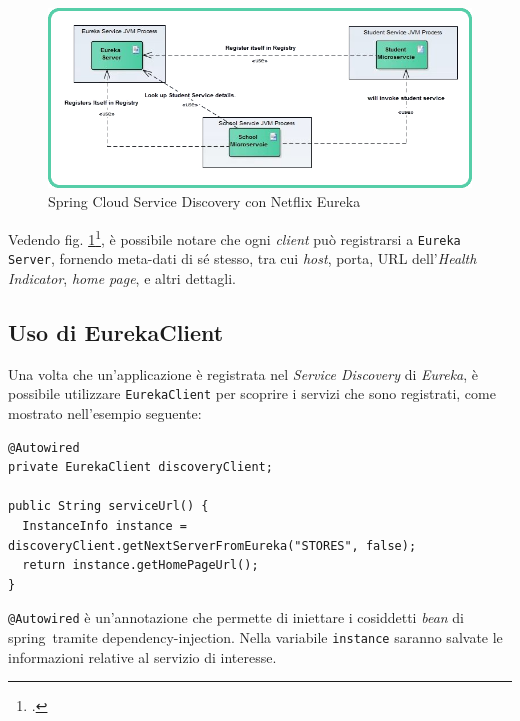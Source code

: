 \begin{figure}[H]
	\centering
	\includegraphics[width=\textwidth]{immagini/netflix-eureka.png}
	\caption[Spring Cloud Service Discovery con Netflix Eureka]{Spring Cloud Service Discovery con Netflix Eureka\footnotemark}
	\label{fig:netflix-eureka}
\end{figure}

Vedendo fig. \ref{fig:netflix-eureka}\footcite{site:fonte-netflix-eureka}, è possibile notare che ogni \textit{client} può registrarsi a \texttt{Eureka Server}, fornendo meta-dati di sé stesso, tra cui \textit{host}, porta, URL dell'\textit{Health Indicator}, \textit{home page}, e altri dettagli.

\subsection{Uso di EurekaClient} Una volta che un'applicazione è registrata nel \textit{Service Discovery} di \textit{Eureka}, è possibile utilizzare \texttt{EurekaClient} per scoprire i servizi che sono registrati, come mostrato nell'esempio seguente:

 \begin{tcolorbox}
 	\begin{lstlisting}
@Autowired
private EurekaClient discoveryClient;

public String serviceUrl() {
  InstanceInfo instance = discoveryClient.getNextServerFromEureka("STORES", false);
  return instance.getHomePageUrl();
}
 	\end{lstlisting}
 \end{tcolorbox}

\texttt{@Autowired} è un'annotazione che permette di iniettare i cosiddetti \textit{bean} di \gls{spring}\gloss\ tramite \gls{dependency-injection}\gloss. Nella variabile \texttt{instance} saranno salvate le informazioni relative al servizio di interesse.

